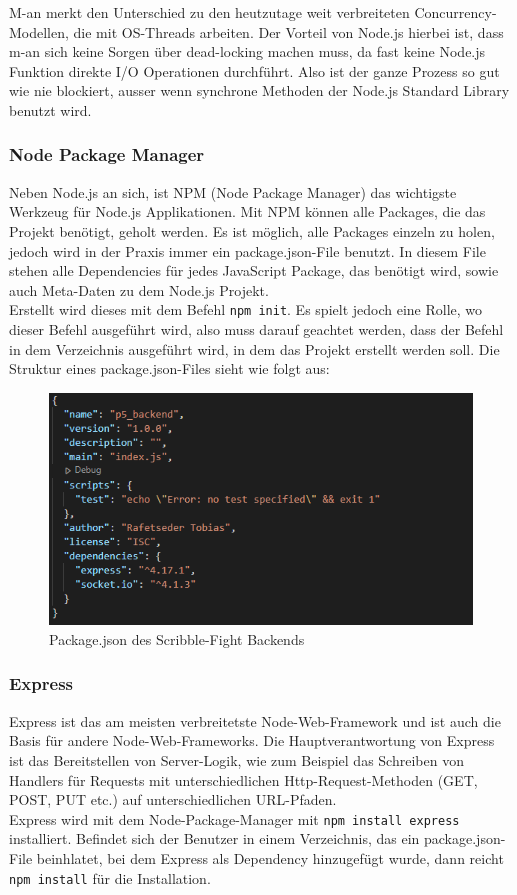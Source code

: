 M-an merkt den Unterschied zu den heutzutage weit verbreiteten Concurrency-Modellen, die mit OS-Threads arbeiten. Der Vorteil von Node.js hierbei ist, dass
m-an sich keine Sorgen über dead-locking machen muss, da fast keine Node.js Funktion direkte I/O Operationen durchführt. Also ist der ganze Prozess so gut wie nie blockiert, ausser
wenn synchrone Methoden der Node.js Standard Library benutzt wird.

\subsubsection{Node Package Manager}\label{NPM}
Neben Node.js an sich, ist NPM (Node Package Manager) das wichtigste Werkzeug für Node.js Applikationen. Mit NPM können alle Packages, die das Projekt benötigt, geholt werden.
Es ist möglich, alle Packages einzeln zu holen, jedoch wird in der Praxis immer ein package.json-File benutzt. In diesem File stehen alle Dependencies für jedes JavaScript Package,
das benötigt wird, sowie auch Meta-Daten zu dem Node.js Projekt. \cite{node_environment}  \\
Erstellt wird dieses mit dem Befehl \texttt{npm init}. Es spielt jedoch eine Rolle, wo dieser Befehl ausgeführt wird, also muss darauf geachtet werden, dass der Befehl in dem Verzeichnis ausgeführt wird, in dem das Projekt erstellt werden soll.
Die Struktur eines package.json-Files sieht wie folgt aus:
\begin{figure}[H]
    \centering
    \includegraphics[scale=1]{pics/package json.PNG}
    \caption{Package.json des Scribble-Fight Backends}
\end{figure}

\subsubsection{Express}
Express ist das am meisten verbreitetste Node-Web-Framework und ist auch die Basis für andere Node-Web-Frameworks. Die Hauptverantwortung
von Express ist das Bereitstellen von Server-Logik, wie zum Beispiel das Schreiben von Handlers für Requests mit unterschiedlichen Http-Request-Methoden (GET, POST, PUT etc.) auf unterschiedlichen URL-Pfaden. \cite{node_environment} \\
Express wird mit dem Node-Package-Manager mit \texttt{npm install express} installiert. Befindet sich der Benutzer in
einem Verzeichnis, das ein package.json-File beinhlatet, bei dem Express als Dependency hinzugefügt wurde, dann reicht \texttt{npm install} für die Installation.

